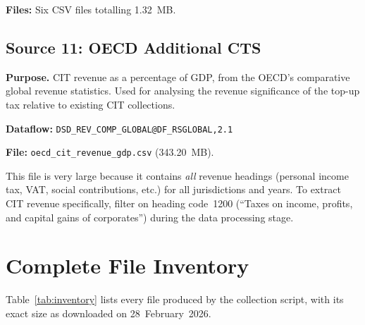 \documentclass[12pt,a4paper]{article}
\begin{document}
\textbf{Files:} Six CSV files totalling 1.32~MB.


\subsection{Source 11: OECD Additional CTS}\label{sec:src_cts}

\textbf{Purpose.}
CIT revenue as a percentage of GDP, from the OECD's comparative global revenue statistics.
Used for analysing the revenue significance of the top-up tax relative to existing CIT collections.

\textbf{Dataflow:} \texttt{DSD\_REV\_COMP\_GLOBAL@DF\_RSGLOBAL,2.1}

\textbf{File:} \texttt{oecd\_cit\_revenue\_gdp.csv} (343.20~MB).

\begin{notebox}
This file is very large because it contains \emph{all} revenue headings (personal income tax, VAT, social contributions, etc.) for all jurisdictions and years.
To extract CIT revenue specifically, filter on heading code~1200 (``Taxes on income, profits, and capital gains of corporates'') during the data processing stage.
\end{notebox}


\section{Complete File Inventory}\label{sec:inventory}

Table~\ref{tab:inventory} lists every file produced by the collection script, with its exact size as downloaded on 28~February~2026.
\end{document}
